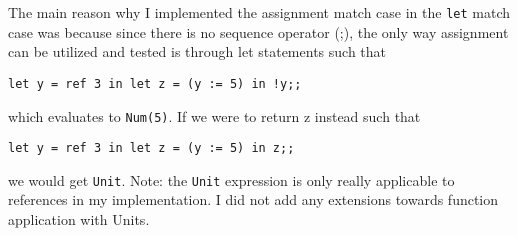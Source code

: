 \documentclass{article}
\def\code#1{\texttt{#1}}
\begin{document}
The main reason why I implemented the assignment match case in the \code{let} match case was because since there is no sequence operator (;), the only way assignment can be utilized and tested is through let statements such that 

\begin{verbatim}
let y = ref 3 in let z = (y := 5) in !y;;
\end{verbatim}

which evaluates to \code{Num(5)}. If we were to return z instead such that 

\begin{verbatim}
let y = ref 3 in let z = (y := 5) in z;;
\end{verbatim}

we would get \code{Unit}. 
Note: the \code{Unit} expression is only really applicable to references in my implementation. I did not add any extensions towards function application with Units.
\end{document}
